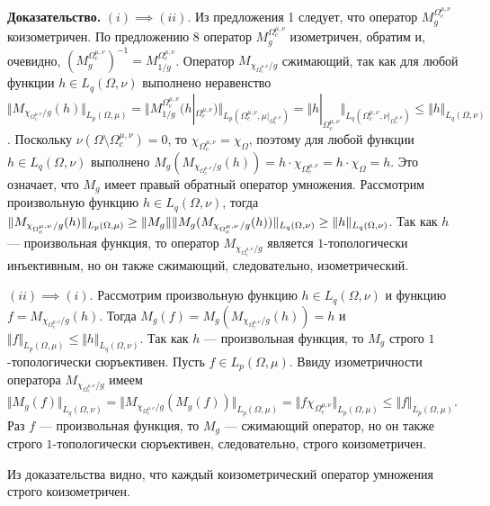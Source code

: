 \documentclass[11pt,twoside]{article}
\begin{document}
\textbf{Доказательство.} $(i)$$\implies$$ (ii)$. Из предложения 1 следует, что
        оператор $M_g^{\Omega_c^{\mu,\nu}}$ коизометричен. По предложению 8
        оператор $M_g^{\Omega_c^{\mu,\nu}}$ изометричен, обратим и, очевидно,
    ${(M_g^{\Omega_c^{\mu,\nu}})}^{-1}=M_{1/g}^{\Omega_c^{\mu,\nu}}$.
        Оператор $M_{\chi_{\Omega_c^{\mu,\nu}}/g}$ сжимающий, так как для любой
        функции $h\in L_q(\Omega,\nu)$ выполнено неравенство $\Vert
    M_{\chi_{\Omega_c^{\mu,\nu}}/g}(h)\Vert_{L_p(\Omega,\mu)}= \Vert
    M_{1/g}^{\Omega_c^{\mu,\nu}}(h|_{\Omega_c^{\mu,\nu}})
    \Vert_{L_p(\Omega_c^{\mu,\nu},\mu|_{\Omega_c^{\mu,\nu}})} =\Vert
    h|_{\Omega_c^{\mu,\nu}}
    \Vert_{L_q(\Omega_c^{\mu,\nu},\nu|_{\Omega_c^{\mu,\nu}})} \leq\Vert h
    \Vert_{L_q(\Omega,\nu)}$. Поскольку
    $\nu(\Omega\setminus\Omega_c^{\mu,\nu})=0$, то
    $\chi_{\Omega_c^{\mu,\nu}}=\chi_{\Omega}$, поэтому для любой функции
    $h\in L_q(\Omega,\nu)$ выполнено
    $M_g(M_{\chi_{\Omega_c^{\mu,\nu}}/g}(h))
    =h\cdot\chi_{\Omega_c^{\mu,\nu}} =h\cdot\chi_{\Omega}=h$. Это означает,
        что $M_g$ имеет правый обратный оператор умножения. Рассмотрим
        произвольную функцию $h\in L_q(\Omega,\nu)$, тогда $\Vert
    M_{\chi_{\Omega_c^{\mu,\nu}}/g}(h)\Vert_{L_p(\Omega,\mu)} \geq\Vert
    M_g\Vert\Vert
    M_g(M_{\chi_{\Omega_c^{\mu,\nu}}/g}(h))\Vert_{L_q(\Omega,\nu)}\\
    \geq\Vert h\Vert_{L_q(\Omega,\nu)}$. Так как $h$ --- произвольная функция,
        то оператор $M_{\chi_{\Omega_c^{\mu,\nu}}/g}$ является $1$-топологически
        инъективным, но он также сжимающий, следовательно, изометрический.

    $(ii)$$\implies$$ (i)$. Рассмотрим произвольную функцию $h\in
    L_q(\Omega,\nu)$ и функцию $f=M_{\chi_{\Omega_c^{\mu,\nu}}/g}(h)$. Тогда
    $M_g(f)=M_g(M_{\chi_{\Omega_c^{\mu,\nu}}/g}(h))=h$ и $\Vert
    f\Vert_{L_p(\Omega,\mu)}\leq\Vert h\Vert_{L_q(\Omega,\nu)}$. Так как $h$
        --- произвольная функция, то $M_g$ строго $1$-топологически сюръективен.
        Пусть $f\in L_p(\Omega,\mu)$. Ввиду изометричности оператора
    $M_{\chi_{\Omega_c^{\mu,\nu}}/g}$ имеем $\Vert
    M_g(f)\Vert_{L_q(\Omega,\nu)} =\Vert
    M_{\chi_{\Omega_c^{\mu,\nu}}/g}(M_g(f))\Vert_{L_p(\Omega,\mu)} =\Vert
    f\chi_{\Omega_c^{\mu,\nu}}\Vert_{L_p(\Omega,\mu)} \leq\Vert
    f\Vert_{L_p(\Omega,\mu)}$. Раз $f$ --- произвольная функция, то $M_g$
        --- сжимающий оператор, но он также строго $1$-топологически
        сюръективен, следовательно, строго коизометричен.

        Из доказательства видно, что каждый коизометрический оператор умножения
        строго коизометричен.
\end{document}
